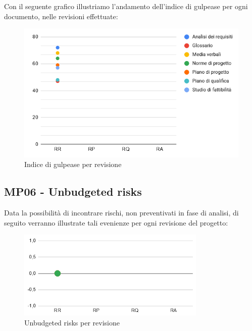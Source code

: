 \noindent Con il seguente grafico illustriamo l'andamento dell'indice di gulpease per ogni documento, nelle revisioni effettuate:
\begin{figure}[H]
	\centering
	\includegraphics[width=13cm]{images/gulpease.png}
	\caption{Indice di gulpease per revisione}
\end{figure}

\subsection{MP06 - Unbudgeted risks}
Data la possibilità di incontrare rischi, non preventivati in fase di analisi, di seguito verranno illustrate tali evenienze per ogni revisione del progetto:
\begin{figure}[H]
	\centering
	\includegraphics[width=9cm]{images/unbudgeted_risks.png}
	\caption{Unbudgeted risks per revisione}
\end{figure}
